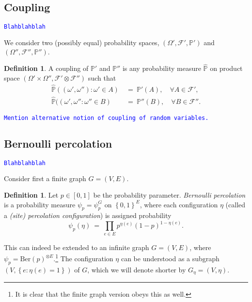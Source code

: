 \documentclass[12pt]{article}
\newcommand{\F}{\mathcal{F}}
\renewcommand{\P}{\mathbb{P}}
\newcommand{\set}[1]{\left\{#1\right\}}
\newcommand{\1}{\mathbbm{1}}
\newcommand{\5}{\vspace{0.5cm}}
\renewcommand{\hat}{\widehat}
\theoremstyle{definition}
\newtheorem{df}[thm]{Definition}
\begin{document}

\subsection{Coupling}

\textcolor{blue}{\texttt{Blahblahblah}} %

We consider two (possibly equal) probability spaces, $(\Omega',\F',\P')$ and $(\Omega'',\F'',\P'')$.

\begin{df}
A coupling of $\P'$ and $\P''$ is any probability measure $\hat{\P}$ on product space $(\Omega'\times\Omega'',\F'\otimes\F'')$ such that 
\begin{align*}
\hat{\P}((\omega',\omega''):\omega'\in A) ~&=~ \P'(A), \quad \forall A\in\F', \\
\hat{\P}((\omega',\omega'':\omega''\in B) ~&=~ \P''(B), \quad \forall B\in\F''.
\end{align*}
\end{df}

\textcolor{blue}{\texttt{Mention alternative notion of coupling of random variables.}}


\subsection{Bernoulli percolation}

\textcolor{blue}{\texttt{Blahblahblah}} %

Consider first a finite graph $G=(V,E)$.
\begin{df}
Let $p\in[0,1]$ be the probability parameter. \textit{Bernoulli percolation} is a probability measure $\psi_p=\psi_p^G$ on $\set{0,1}^E$, where each configuration $\eta$ (called a \textit{(site) percolation configuration}) is assigned probability
$$\psi_p(\eta) ~=~ \prod_{e\in E}p^{\eta(e)}(1-p)^{1-\eta(e)}.$$
\end{df}
This can indeed be extended to an infinite graph $G=(V,E)$, where $\psi_p=\mathrm{Ber}(p)^{\otimes E}$.\footnote{It is clear that the finite graph version obeys this as well.} The configuration $\eta$ can be understood as a subgraph $(V,\set{e:\eta(e)=1})$ of $G$, which we will denote shorter by $G_\eta=(V,\eta)$.\\
\end{document}
